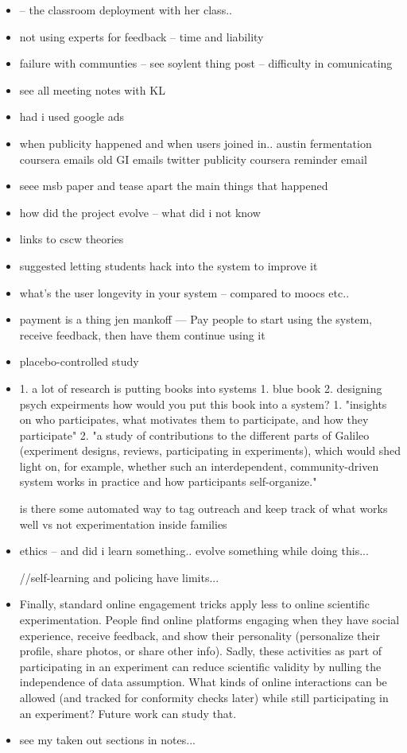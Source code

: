 \begin{itemize}
\item -- the classroom deployment with her class..
\item not using experts for feedback -- time and liability
\item failure with communties  -- see soylent thing post -- difficulty in comunicating 
\item see all meeting notes with KL
\item had i used google ads
\item when publicity happened and when users joined in.. 
    austin fermentation
    coursera emails
    old GI emails
    twitter publicity
    coursera reminder email
\item seee msb paper and tease apart the main things that happened
\item how did the project evolve -- what did i not know
\item links to cscw theories
\item suggested letting students hack into the system to improve it
\item  what’s the user longevity in your system -- compared to moocs etc..
\item payment is a thing 
jen mankoff — Pay people to start using the system, receive feedback, then have them continue using it 
\item placebo-controlled study 
\item 1. a lot of research is putting books into systems
    1. blue book
    2. designing psych expeirments
how would you put this book into a system?
1. "insights on who participates, what motivates them to participate, and how they participate"
2. "a study of contributions to the different parts of Galileo (experiment designs, reviews,   participating in experiments), which would shed light on, for example, whether   such an interdependent, community-driven system works in practice and how   participants self-organize."

is there some automated way to tag outreach and keep track of what works well vs not
experimentation inside families

\item ethics -- and did i learn something.. evolve something while doing this...

//self-learning and policing have limits...

\item Finally, standard online engagement tricks apply less to online scientific experimentation. People find online platforms engaging when they have social experience, receive feedback, and show their personality (personalize their profile, share photos, or share other info). Sadly, these activities as part of participating in an experiment can reduce scientific validity by nulling the independence of data assumption. What kinds of online interactions can be allowed (and tracked for conformity checks later) while still participating in an experiment? Future work can study that.
\item see my taken out sections in notes...


\end{itemize}
